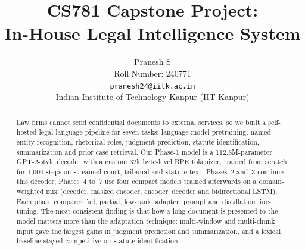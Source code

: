 \documentclass[10pt,a4paper]{article}
\title{\vspace{-1.2cm}\textbf{CS781 Capstone Project:\\In-House Legal Intelligence System}}
\author{Pranesh S\\Roll Number: 240771\\\texttt{pranesh24@iitk.ac.in}\\Indian Institute of Technology Kanpur (IIT Kanpur)}
\date{}
\begin{document}
\maketitle
\vspace{-0.8cm}
\begin{abstract}\small\noindent
Law firms cannot send confidential documents to external services, so we built a self-hosted legal language pipeline for seven tasks: language-model pretraining, named entity recognition, rhetorical roles, judgment prediction, statute identification, summarization and prior case retrieval. Our Phase-1 model is a 112.8M-parameter GPT-2-style decoder with a custom 32k byte-level BPE tokenizer, trained from scratch for 1{,}000 steps on streamed court, tribunal and statute text. Phases~2 and~3 continue this decoder; Phases~4 to~7 use four compact models trained afterwards on a domain-weighted mix (decoder, masked encoder, encoder--decoder and bidirectional LSTM). Each phase compares full, partial, low-rank, adapter, prompt and distillation fine-tuning. The most consistent finding is that how a long document is presented to the model matters more than the adaptation technique: multi-window and multi-chunk input gave the largest gains in judgment prediction and summarization, and a lexical baseline stayed competitive on statute identification.
\end{abstract}
\end{document}
